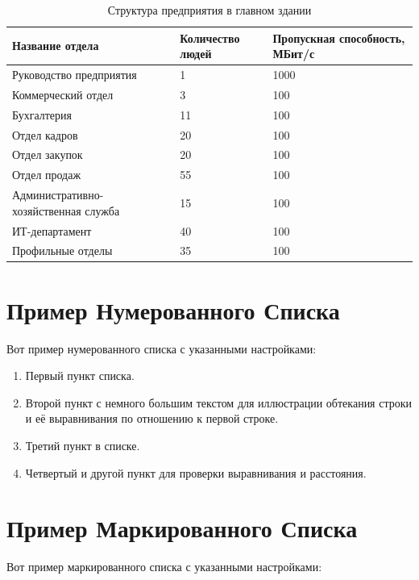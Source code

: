 \documentclass[14pt, a4paper]{extarticle}
\numberwithin{equation}{section}
\begin{document}
\begin{table}[H]
\centering
\small
\caption{Структура предприятия в главном здании}
\begin{tabular}{|m{5cm}|m{3cm}|m{3cm}|}
\hline
\textbf{Название отдела} & \textbf{Количество людей} & \textbf{Пропускная способность, МБит/с} \\
\hline
Руководство предприятия & 1 & 1000 \\
\hline
Коммерческий отдел & 3 & 100 \\
\hline
Бухгалтерия & 11 & 100 \\
\hline
Отдел кадров & 20 & 100 \\
\hline
Отдел закупок & 20 & 100 \\
\hline
Отдел продаж & 55 & 100 \\
\hline
Административно-хозяйственная служба & 15 & 100 \\
\hline
ИТ-департамент & 40 & 100 \\
\hline
Профильные отделы & 35 & 100 \\
\hline
\end{tabular}
\label{table:1:mainDepStructure}
\end{table}


\section{Пример Нумерованного Списка}

Вот пример нумерованного списка с указанными настройками:

\begin{enumerate}
    \item Первый пункт списка.
    \item Второй пункт с немного большим текстом для иллюстрации обтекания строки и её выравнивания по отношению к первой строке.
    \item Третий пункт в списке.
    \item Четвертый и другой пункт для проверки выравнивания и расстояния.
\end{enumerate} 

\section{Пример Маркированного Списка}
Вот пример маркированного списка с указанными настройками:
\end{document}
